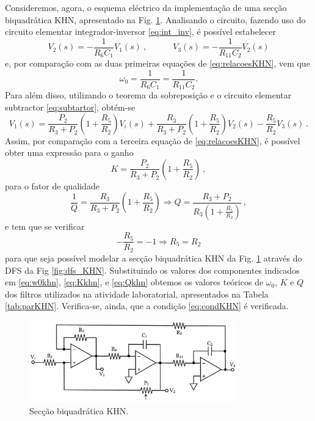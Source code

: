 Consideremos, agora, o esquema eléctrico da implementação de uma secção biquadrática KHN, apresentado na Fig. \ref{fig:KHN}. Analisando o circuito, fazendo uso do circuito elementar integrador-inversor \eqref{eq:int_inv}, é possível estabelecer
\begin{equation}\label{eq:condKNHw0}
V_2(s) = -\frac{1}{R_6C_1}V_1(s)\:,\quad \quad \quad V_3(s) = -\frac{1}{R_{11}C_2}V_2(s) 
\end{equation}
e, por comparação com as duas primeiras equações de \eqref{eq:relacoesKHN}, vem que 
\begin{equation}\label{eq:w0khn}
\omega_0 = \frac{1}{R_6C_1}= \frac{1}{R_{11}C_2}.
\end{equation}
Para além disso, utilizando o teorema da sobreposição e o circuito elementar subtractor \eqref{eq:subtartor}, obtém-se
\begin{equation}
V_1(s) =\frac{P_2}{R_3+P_2}\left(1+\frac{R_5}{R_2}\right) V_i(s) + \frac{R_3}{R_3+P_2}\left(1+\frac{R_5}{R_2}\right) V_2(s)  -\frac{R_5}{R_2}V_3(s)\:.
\end{equation}
Assim, por comparação com a terceira equação de \eqref{eq:relacoesKHN}, é possível obter uma expressão para o ganho 
\begin{equation}\label{eq:Kkhn}
    K=\frac{P_2}{R_3+P_2}\left(1+\frac{R_5}{R_2}\right)\:,
\end{equation}
para o fator de qualidade
\begin{equation} \label{eq:Qkhn}
    \frac{1}{Q}=\frac{R_3}{R_3+P_2}\left(1+\frac{R_5}{R_2}\right) \Rightarrow Q = \frac{R_3+P_2}{R_3\left(1+\frac{R_5}{R_2}\right)}\:,
\end{equation}
e tem que se verificar 
\begin{equation}\label{eq:condKHN}
    -\frac{R_5}{R_2} = -1 \Rightarrow R_5 = R_2
\end{equation}
para que seja possível modelar a secção biquadrática KHN da Fig. \ref{fig:KHN} através do DFS da Fig \ref{fig:dfs_KHN}. Substituindo os valores dos componentes indicados em \eqref{eq:w0khn}, \eqref{eq:Kkhn}, e \eqref{eq:Qkhn} obtemos os valores teóricos de $\omega_0$, $K$ e $Q$ dos filtros utilizados na atividade laboratorial, apresentados na Tabela \ref{tab:parKHN}. Verifica-se, ainda, que a condição \eqref{eq:condKHN} é verificada.

\begin{figure}[h!]
    \centering
    \includegraphics[width = 0.8\textwidth]{Imagens/KHN.png}
    \caption{Secção biquadrática KHN.}
    \label{fig:KHN}
\end{figure}

